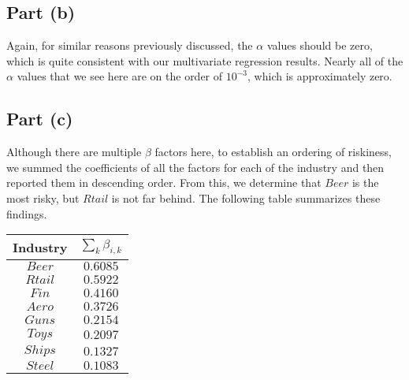 \documentclass[12pt]{article}
\begin{document}
	\subsection{Part (b)}
	
		Again, for similar reasons previously discussed, the $\alpha$ values should be zero, which is quite consistent with our multivariate regression results. 
		Nearly all of the $\alpha$ values that we see here are on the order of $10^{-3}$, which is approximately zero.
		
	\subsection{Part (c)}
	
		Although there are multiple $\beta$ factors here, to establish an ordering of riskiness, we summed the coefficients of all the factors for each of the 
		industry and then reported them in descending order. From this, we determine that $Beer$ is the most risky, but $Rtail$ is not far behind. The following
		table summarizes these findings.  	
		\begin{center}
 		\begin{tabular}{||c c||} 
 		\hline
 		 Industry &  $\sum_{k}\beta_{i,k}$ \\ [0.5ex] 
 		\hline \hline
 		$Beer$ & $0.6085$  \\ 
 		\hline
 		$Rtail$ & $0.5922$ \\
 		\hline
 		$Fin$ & $0.4160$  \\
 		\hline
 		$Aero$ & $0.3726$  \\
 		\hline
 		$Guns$ & $0.2154$  \\
 		\hline
 		$Toys$ & $0.2097$ \\
 		\hline
 		$Ships$ & $0.1327$ \\
 		\hline
 		$Steel$ & $0.1083$ \\ 
 		\hline
		\end{tabular}
		\end{center}
		
\end{document}

